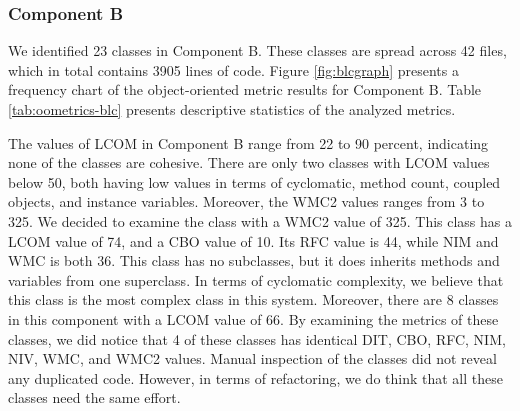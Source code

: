 



\subsubsection{Component B}
We identified 23 classes in Component B. These classes are spread across 42 files, which in total contains 3905 lines of code. Figure \ref{fig:blcgraph} presents a frequency chart of the object-oriented metric results for Component B. Table \ref{tab:oometrics-blc} presents descriptive statistics of the analyzed metrics.

The values of LCOM in Component B range from 22 to 90 percent, indicating none of the classes are cohesive. There are only two classes with LCOM values below 50, both having low values in terms of cyclomatic, method count, coupled objects, and instance variables. Moreover, the WMC2 values ranges from 3 to 325. We decided to examine the class with a WMC2 value of 325. This class has a LCOM value of 74, and a CBO value of 10. Its RFC value is 44, while NIM and WMC is both 36. This class has no subclasses, but it does inherits methods and variables from one superclass. In terms of cyclomatic complexity, we believe that this class is the most complex class in this system. Moreover, there are 8 classes in this component with a LCOM value of 66. By examining the metrics of these classes, we did notice that 4 of these classes has identical DIT, CBO, RFC, NIM, NIV, WMC, and WMC2 values. Manual inspection of the classes did not reveal any duplicated code. However, in terms of refactoring, we do think that all these classes need the same effort.



